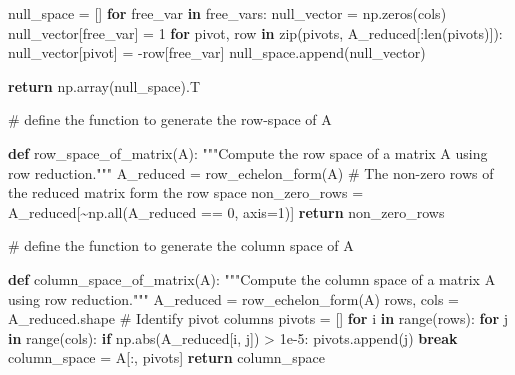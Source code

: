 \documentclass[
  letterpaper,
  DIV=11,
  numbers=noendperiod]{scrreprt}
\newenvironment{Shaded}{\begin{snugshade}}{\end{snugshade}}
\newcommand{\BuiltInTok}[1]{\textcolor[rgb]{0.00,0.23,0.31}{#1}}
\newcommand{\CommentTok}[1]{\textcolor[rgb]{0.37,0.37,0.37}{#1}}
\newcommand{\ControlFlowTok}[1]{\textcolor[rgb]{0.00,0.23,0.31}{\textbf{#1}}}
\newcommand{\DecValTok}[1]{\textcolor[rgb]{0.68,0.00,0.00}{#1}}
\newcommand{\FloatTok}[1]{\textcolor[rgb]{0.68,0.00,0.00}{#1}}
\newcommand{\KeywordTok}[1]{\textcolor[rgb]{0.00,0.23,0.31}{\textbf{#1}}}
\newcommand{\NormalTok}[1]{\textcolor[rgb]{0.00,0.23,0.31}{#1}}
\newcommand{\OperatorTok}[1]{\textcolor[rgb]{0.37,0.37,0.37}{#1}}
\theoremstyle{plain}
\theoremstyle{definition}
\theoremstyle{remark}
\begin{document}
\begin{Shaded}
\begin{Highlighting}[]
\NormalTok{    null\_space }\OperatorTok{=}\NormalTok{ []}
    \ControlFlowTok{for}\NormalTok{ free\_var }\KeywordTok{in}\NormalTok{ free\_vars:}
\NormalTok{        null\_vector }\OperatorTok{=}\NormalTok{ np.zeros(cols)}
\NormalTok{        null\_vector[free\_var] }\OperatorTok{=} \DecValTok{1}
        \ControlFlowTok{for}\NormalTok{ pivot, row }\KeywordTok{in} \BuiltInTok{zip}\NormalTok{(pivots, A\_reduced[:}\BuiltInTok{len}\NormalTok{(pivots)]):}
\NormalTok{            null\_vector[pivot] }\OperatorTok{=} \OperatorTok{{-}}\NormalTok{row[free\_var]}
\NormalTok{        null\_space.append(null\_vector)}
    
    \ControlFlowTok{return}\NormalTok{ np.array(null\_space).T}

\CommentTok{\# define the function to generate the row{-}space of A}

\KeywordTok{def}\NormalTok{ row\_space\_of\_matrix(A):}
    \CommentTok{"""Compute the row space of a matrix A using row reduction."""}
\NormalTok{    A\_reduced }\OperatorTok{=}\NormalTok{ row\_echelon\_form(A)}
    \CommentTok{\# The non{-}zero rows of the reduced matrix form the row space}
\NormalTok{    non\_zero\_rows }\OperatorTok{=}\NormalTok{ A\_reduced[}\OperatorTok{\textasciitilde{}}\NormalTok{np.}\BuiltInTok{all}\NormalTok{(A\_reduced }\OperatorTok{==} \DecValTok{0}\NormalTok{, axis}\OperatorTok{=}\DecValTok{1}\NormalTok{)]}
    \ControlFlowTok{return}\NormalTok{ non\_zero\_rows}

\CommentTok{\# define the function to generate the column space of A}

\KeywordTok{def}\NormalTok{ column\_space\_of\_matrix(A):}
    \CommentTok{"""Compute the column space of a matrix A using row reduction."""}
\NormalTok{    A\_reduced }\OperatorTok{=}\NormalTok{ row\_echelon\_form(A)}
\NormalTok{    rows, cols }\OperatorTok{=}\NormalTok{ A\_reduced.shape}
    \CommentTok{\# Identify pivot columns}
\NormalTok{    pivots }\OperatorTok{=}\NormalTok{ []}
    \ControlFlowTok{for}\NormalTok{ i }\KeywordTok{in} \BuiltInTok{range}\NormalTok{(rows):}
        \ControlFlowTok{for}\NormalTok{ j }\KeywordTok{in} \BuiltInTok{range}\NormalTok{(cols):}
            \ControlFlowTok{if}\NormalTok{ np.}\BuiltInTok{abs}\NormalTok{(A\_reduced[i, j]) }\OperatorTok{\textgreater{}} \FloatTok{1e{-}5}\NormalTok{:}
\NormalTok{                pivots.append(j)}
                \ControlFlowTok{break}
\NormalTok{    column\_space }\OperatorTok{=}\NormalTok{ A[:, pivots]}
    \ControlFlowTok{return}\NormalTok{ column\_space}
\end{Highlighting}
\end{Shaded}
\end{document}
